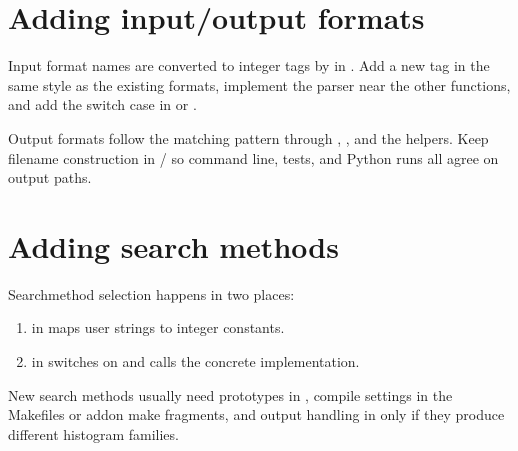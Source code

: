 \documentclass[letterpaper,10pt,english]{sphinxmanual}
\begin{document}
\section{Adding input/output formats}
\label{\detokenize{code_structure:adding-input-output-formats}}
\sphinxAtStartPar
Input format names are converted to integer tags by
 in . Add a new tag in the same
style as the existing formats, implement the parser near the other
 functions, and add the switch case in  or
.

\sphinxAtStartPar
Output formats follow the matching pattern through
, , and the  helpers.
Keep filename construction in / so command
line, tests, and Python runs all agree on output paths.


\section{Adding search methods}
\label{\detokenize{code_structure:adding-search-methods}}
\sphinxAtStartPar
Search\sphinxhyphen{}method selection happens in two places:
\begin{enumerate}
%
\item {} 
\sphinxAtStartPar
{} in  maps user strings
to integer constants.

\item {} 
\sphinxAtStartPar
{} in  switches on  and
calls the concrete implementation.

\end{enumerate}

\sphinxAtStartPar
New search methods usually need prototypes in , compile
settings in the Makefiles or add\sphinxhyphen{}on make fragments, and output handling in
 only if they produce different histogram families.
\end{document}
